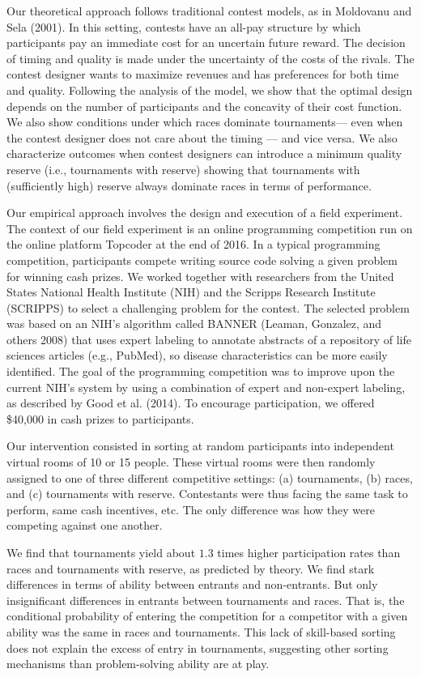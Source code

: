 \documentclass[10pt, titlepage]{article}
\begin{document}
Our theoretical approach follows traditional contest models, as in
Moldovanu and Sela (2001). In this setting, contests have an all-pay
structure by which participants pay an immediate cost for an uncertain
future reward. The decision of timing and quality is made under the
uncertainty of the costs of the rivals. The contest designer wants to
maximize revenues and has preferences for both time and quality.
Following the analysis of the model, we show that the optimal design
depends on the number of participants and the concavity of their cost
function. We also show conditions under which races dominate
tournaments--- even when the contest designer does not care about the
timing --- and vice versa. We also characterize outcomes when contest
designers can introduce a minimum quality reserve (i.e., tournaments
with reserve) showing that tournaments with (sufficiently high) reserve
always dominate races in terms of performance.

Our empirical approach involves the design and execution of a field
experiment. The context of our field experiment is an online programming
competition run on the online platform Topcoder at the end of 2016. In a
typical programming competition, participants compete writing source
code solving a given problem for winning cash prizes. We worked together
with researchers from the United States National Health Institute (NIH)
and the Scripps Research Institute (SCRIPPS) to select a challenging
problem for the contest. The selected problem was based on an NIH's
algorithm called BANNER (Leaman, Gonzalez, and others 2008) that uses
expert labeling to annotate abstracts of a repository of life sciences
articles (e.g., PubMed), so disease characteristics can be more easily
identified. The goal of the programming competition was to improve upon
the current NIH's system by using a combination of expert and non-expert
labeling, as described by Good et al. (2014). To encourage
participation, we offered \$40,000 in cash prizes to participants.

Our intervention consisted in sorting at random participants into
independent virtual rooms of 10 or 15 people. These virtual rooms were
then randomly assigned to one of three different competitive settings:
(a) tournaments, (b) races, and (c) tournaments with reserve.
Contestants were thus facing the same task to perform, same cash
incentives, etc. The only difference was how they were competing against
one another.

We find that tournaments yield about \(1.3\) times higher participation
rates than races and tournaments with reserve, as predicted by theory.
We find stark differences in terms of ability between entrants and
non-entrants. But only insignificant differences in entrants between
tournaments and races. That is, the conditional probability of entering
the competition for a competitor with a given ability was the same in
races and tournaments. This lack of skill-based sorting does not explain
the excess of entry in tournaments, suggesting other sorting mechanisms
than problem-solving ability are at play.
\end{document}
